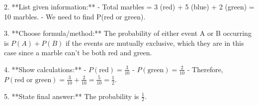 2. **List given information:**
   - Total marbles = 3 (red) + 5 (blue) + 2 (green) = 10 marbles.
   - We need to find P(red or green).

3. **Choose formula/method:**  
   The probability of either event A or B occurring is \( P(A) + P(B) \) if the events are mutually exclusive, which they are in this case since a marble can't be both red and green.

4. **Show calculations:**
   - \( P(\text{red}) = \frac{3}{10} \)
   - \( P(\text{green}) = \frac{2}{10} \)
   - Therefore, \( P(\text{red or green}) = \frac{3}{10} + \frac{2}{10} = \frac{5}{10} = \frac{1}{2} \).

5. **State final answer:**  
   The probability is \( \boxed{\frac{1}{2}} \).